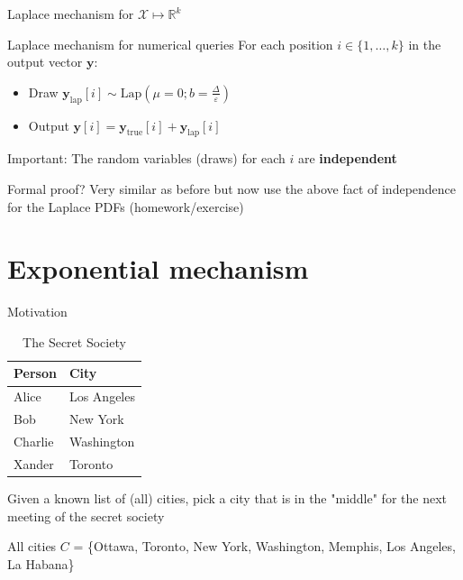 \documentclass[12pt,aspectratio=169,handout]{beamer}
\begin{document}
\begin{frame}{Laplace mechanism for $\mathcal{X} \mapsto \mathbb{R}^k$}

\begin{block}{Laplace mechanism for numerical queries}
For each position $i \in \{1, \dots, k\}$ in the output vector $\mathbf{y}$:
\begin{itemize}
\item Draw $\mathbf{y}_{\mathrm{lap}}[i] \sim \textrm{Lap}(\mu = 0; b=\frac{\Delta}{\varepsilon})$
\item Output $\mathbf{y}[i] = \mathbf{y}_{\mathrm{true}}[i] + \mathbf{y}_{\mathrm{lap}}[i]$
\end{itemize}
\end{block}

Important: The random variables (draws) for each $i$ are \textbf{independent}

Formal proof? Very similar as before but now use the above fact of independence for the Laplace PDFs (homework/exercise)

\end{frame}

\section{Exponential mechanism}


\begin{frame}{Motivation}

\begin{table}
\footnotesize
\begin{tabular}{ll}
\toprule
Person & City \\ \midrule
Alice & Los Angeles \\
Bob & New York \\
Charlie & Washington \\
Xander & Toronto \\ \bottomrule
\end{tabular}
\caption{The Secret Society}
\end{table}

Given a known list of (all) cities, pick a city that is in the "middle" for the next meeting of the secret society

All cities $C$ = \{Ottawa, Toronto, New York, Washington, Memphis, Los Angeles, La Habana\}
\end{frame}
\end{document}
